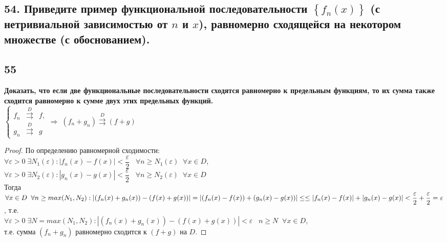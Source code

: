 \documentclass[a4paper, fleqn]{article}
\begin{document}
    \subsection*{54. Приведите пример функциональной последовательности $\left\{f_n(x)\right\}$ (с нетривиальной зависимостью от $n$ и $x$), равномерно сходящейся на некотором множестве (с обоснованием).}
    \begin{example}
        \begin{flalign*}
            &f_n(x) = , \hspace{1cm} D = \left[ 0; +\infty \right) \\
            &f_n(x) \overset{D}{\rightrightarrows} 0 \\
            & \norm{f_n - 0} = \norm{f_n} = \sup_{x \in D} \left| f_n(x) \right| = \frac{1}{n} \to 0 \\
            & \implies \text{ последовательность сходится равномерно.}
        \end{flalign*}
    \end{example}
        
    \subsection*{55}
        \textbf{ Доказать, что если две функциональные последовательности сходятся равномерно к предельным функциям, то их сумма также сходится равномерно к сумме двух этих предельных функций.} \\[5 pt]
	$\left\{\begin{array}{lll} 
	f_n &\overset{D}{\rightrightarrows}& f, \\[5 pt]
	g_n &\overset{D}{\rightrightarrows}& g
	\end{array}\right. \Rightarrow \; (f_n + g_n) \overset{D}{\rightrightarrows} (f + g)$
	\begin{proof}
	По определению равномерной сходимости: \\[3 pt]
	$\forall \varepsilon > 0 \; \exists N_1(\varepsilon) : |f_n(x) - f(x)| < \dfrac{\varepsilon}2 \;\;\; \forall n \ge N_1(\varepsilon)\;\; \forall x \in D$, \\[3 pt]
	$\forall \varepsilon > 0 \; \exists N_2(\varepsilon) : |g_n(x) - g(x)| < \dfrac{\varepsilon}2 \;\;\; \forall n \ge N_2(\varepsilon)\;\; \forall x \in D$ \\[3 pt]
	Тогда \\[3 pt]
	$\forall x \in D \;\; \forall n \ge max(N_1, N_2) : |(f_n(x) + g_n(x)) - (f(x) + g(x))|  = |(f_n(x) - f(x)) + (g_n(x) - g(x))|  \le \\[3 pt]
	\le |f_n(x) - f(x)| + |g_n(x) - g(x)| < \dfrac{\varepsilon}2 + \dfrac{\varepsilon}2 = \varepsilon$, т.е. \\[3 pt]
	$\forall \varepsilon > 0 \; \exists N = max(N_1, N_2) : |(f_n(x) + g_n(x)) - (f(x) + g(x))| < \varepsilon \;\;\; n \ge N \;\; \forall x \in D$, \\[5 pt]
	т.е. сумма $(f_n + g_n)$ равномерно сходится к $(f + g)$ на $D$.
	\end{proof}    
    
\end{document}
